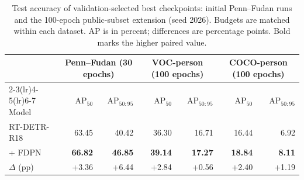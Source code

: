 \begin{table}[t]
\centering
\caption{Test accuracy of validation-selected best checkpoints: initial Penn--Fudan runs and the 100-epoch public-subset extension (seed 2026). Budgets are matched within each dataset. AP is in percent; differences are percentage points. Bold marks the higher paired value.}
\label{tab:test}
\small
\setlength{\tabcolsep}{8pt}
\begin{tabular}{lrrrrrr}
\toprule
& \multicolumn{2}{c}{Penn--Fudan (30 epochs)} & \multicolumn{2}{c}{VOC-person (100 epochs)} & \multicolumn{2}{c}{COCO-person (100 epochs)}\\
\cmidrule(lr){2-3}\cmidrule(lr){4-5}\cmidrule(lr){6-7}
Model & AP$_{50}$ & AP$_{50:95}$ & AP$_{50}$ & AP$_{50:95}$ & AP$_{50}$ & AP$_{50:95}$\\
\midrule
RT-DETR-R18 & 63.45 & 40.42 & 36.30 & 16.71 & 16.44 & 6.92\\
+ FDPN & \textbf{66.82} & \textbf{46.85} & \textbf{39.14} & \textbf{17.27} & \textbf{18.84} & \textbf{8.11}\\
\midrule
$\Delta$ (pp) & +3.36 & +6.44 & +2.84 & +0.56 & +2.40 & +1.19\\
\bottomrule
\end{tabular}
\end{table}
